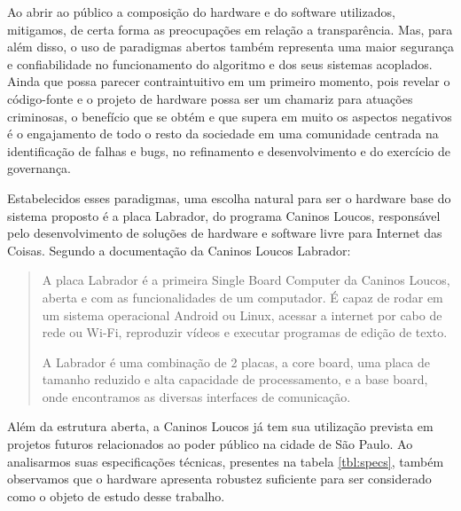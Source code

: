 \documentclass[]{politex}
\begin{document}
Ao abrir ao público a composição do hardware e do software utilizados, mitigamos, de certa forma as preocupações em relação a transparência. Mas, para além disso, o uso de paradigmas abertos também representa uma maior segurança e confiabilidade no funcionamento do algoritmo e dos seus sistemas acoplados. Ainda que possa parecer contraintuitivo em um primeiro momento, pois revelar o código-fonte e o projeto de hardware possa ser um chamariz para atuações criminosas, o benefício que se obtém e que supera em muito os aspectos negativos é o engajamento de todo o resto da sociedade em uma comunidade centrada na identificação de falhas e bugs, no refinamento e desenvolvimento e do exercício de governança. 

Estabelecidos esses paradigmas, uma escolha natural para ser o hardware base do sistema proposto é a placa Labrador, do programa Caninos Loucos, responsável pelo desenvolvimento de soluções de hardware e software livre para Internet das Coisas. Segundo a documentação da Caninos Loucos Labrador\cite{doccaninos}:

\begin{quote}
A placa Labrador é a primeira Single Board Computer da Caninos Loucos, aberta e com as funcionalidades de um computador. É capaz de rodar em um sistema operacional Android ou Linux, acessar a internet por cabo de rede ou Wi-Fi, reproduzir vídeos e executar programas de edição de texto.

A Labrador é uma combinação de 2 placas, a core board, uma placa de tamanho reduzido e alta capacidade de processamento, e a base board, onde encontramos as diversas interfaces de comunicação.
\end{quote}

Além da estrutura aberta, a Caninos Loucos já tem sua utilização prevista em projetos futuros relacionados ao poder público na cidade de São Paulo. Ao analisarmos suas especificações técnicas, presentes na tabela \ref{tbl:specs}, também observamos que o hardware apresenta robustez suficiente para ser considerado como o objeto de estudo desse trabalho.
\end{document}
